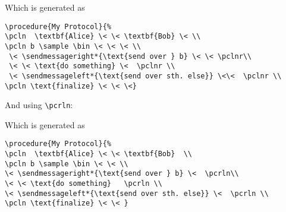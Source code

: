 \documentclass[a4paper]{report}
\begin{document}
\begin{center}
\end{center}
Which is generated as
\begin{lstlisting}
\procedure{My Protocol}{%
\pcln  \textbf{Alice} \< \< \textbf{Bob} \< \\
\pcln b \sample \bin \< \< \< \\
 \< \sendmessageright*{\text{send over } b} \< \< \pclnr\\
 \< \< \text{do something} \<  \pclnr \\
 \< \sendmessageleft*{\text{send over sth. else}} \<\<  \pclnr \\
\pcln \text{finalize} \< \< \<}
\end{lstlisting}



And using \lstinline$\pcrln$:
\begin{center}
\end{center}
Which is generated as
\begin{lstlisting}
\procedure{My Protocol}{%
\pcln  \textbf{Alice} \< \< \textbf{Bob}  \\
\pcln b \sample \bin \< \< \\
\< \sendmessageright*{\text{send over } b} \<  \pcrln\\
\< \< \text{do something}   \pcrln \\
\< \sendmessageleft*{\text{send over sth. else}} \<  \pcrln \\
\pcln \text{finalize} \< \< }
\end{lstlisting}
\end{document}
